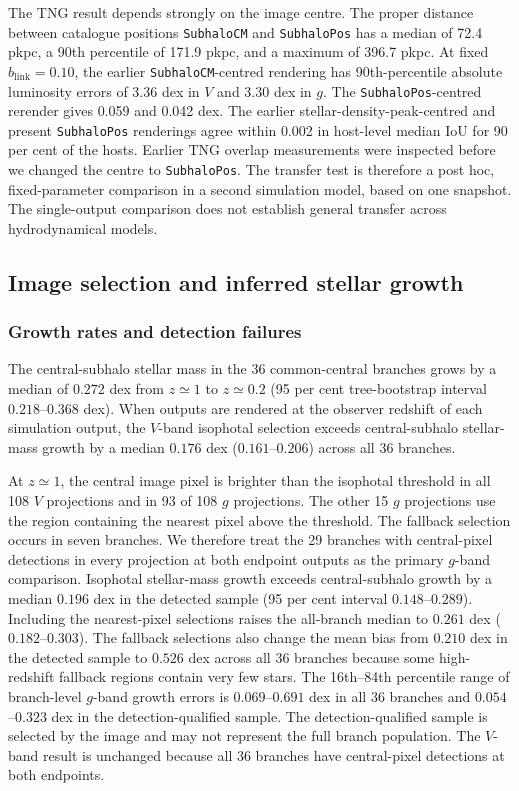 \documentclass[usenatbib]{mnras}
\begin{document}
The TNG result depends strongly on the image centre. The proper distance
between catalogue positions \texttt{SubhaloCM} and \texttt{SubhaloPos}
has a median of 72.4 pkpc, a 90th percentile of 171.9 pkpc, and a maximum
of 396.7 pkpc. At fixed $b_{\mathrm{link}}=0.10$, the earlier
\texttt{SubhaloCM}-centred rendering has 90th-percentile absolute
luminosity errors of 3.36 dex in $V$ and 3.30 dex in $g$. The
\texttt{SubhaloPos}-centred rerender gives 0.059 and 0.042 dex. The
earlier stellar-density-peak-centred and present \texttt{SubhaloPos}
renderings agree within 0.002 in host-level median IoU for 90 per cent
of the hosts. Earlier TNG overlap measurements were inspected before we changed the
centre to \texttt{SubhaloPos}. The transfer test is therefore a post hoc,
fixed-parameter comparison in a second simulation model, based on one
snapshot. The single-output comparison does not establish general transfer across hydrodynamical
models.

\subsection{Image selection and inferred stellar growth}
\label{sec:growthbias}

\subsubsection{Growth rates and detection failures}

The central-subhalo stellar mass in the 36 common-central branches grows
by a median of $0.272$ dex from $z\simeq1$ to $z\simeq0.2$ (95 per cent
tree-bootstrap interval $0.218$--$0.368$ dex). When outputs are rendered
at the observer redshift of each simulation output, the $V$-band isophotal selection
exceeds central-subhalo stellar-mass growth by a median $0.176$ dex
($0.161$--$0.206$) across all 36 branches.

At $z\simeq1$, the central image pixel is brighter than the isophotal
threshold in all 108 $V$ projections and in 93 of 108 $g$ projections.
The other 15 $g$ projections use the region containing the nearest pixel
above the threshold. The fallback selection occurs in seven branches. We therefore treat
the 29 branches with central-pixel detections in every projection at
both endpoint outputs as the primary $g$-band comparison. Isophotal stellar-mass growth exceeds
central-subhalo growth by a median $0.196$ dex in the detected sample
(95 per cent interval $0.148$--$0.289$). Including the nearest-pixel
selections raises the all-branch median to $0.261$ dex
($0.182$--$0.303$). The fallback selections also change the mean bias from $0.210$ dex in
the detected sample to $0.526$ dex across all 36 branches because some
high-redshift fallback regions contain very few stars. The 16th--84th
percentile range of branch-level $g$-band growth errors is $0.069$--$0.691$
dex in all 36 branches and $0.054$--$0.323$ dex in the detection-qualified
sample. The
detection-qualified sample is selected by the image and may not represent
the full branch population. The $V$-band result is unchanged because all
36 branches have central-pixel detections at both endpoints.
\end{document}
